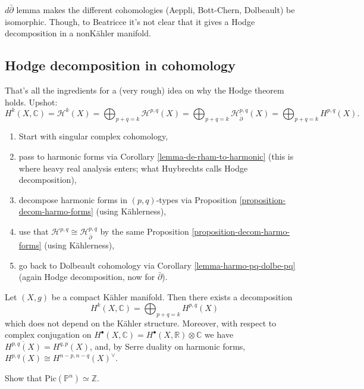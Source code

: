 \begin{remark}
\label{remark-ddbar-importance}
$d\bar\partial$ lemma makes
the different cohomologies 
(Aeppli, Bott-Chern, Dolbeault)
be isomorphic. Though, to Beatricce it's
not clear that it gives a Hodge decomposition
in a nonKähler manifold.
\end{remark}

\subsection{Hodge decomposition in
cohomology}
\label{subsection-hodge-decomposition-cohomology}

\noindent
That's all the ingredients for a
(very rough) idea on why the Hodge theorem
holds.
Upshot:
$$
H^k(X,\mathbb{C})
= \mathcal{H}^k(X)
= \bigoplus_{p+q=k}\mathcal{H}^{p,q}(X)
=
\bigoplus_{p+q=k}\mathcal{H}^{p,q}
_{\bar\partial}(X)
=\bigoplus_{p+q=k}H^{p,q}(X).
$$
\begin{enumerate}
\item Start with singular complex cohomology,
\item pass to harmonic forms
via Corollary \ref{lemma-de-rham-to-harmonic}
(this is where heavy real analysis enters;
what Huybrechts calls Hodge decomposition),
\item decompose harmonic forms in
$(p,q)$-types
via Proposition
\ref{proposition-decom-harmo-forms}
(using Kählerness),
\item use that $\mathcal{H}^{p,q}\cong
\mathcal{H}^{p,q}_{\bar\partial}$
by the same Proposition
\ref{proposition-decom-harmo-forms}
(using Kählerness),
\item go back to Dolbeault cohomology
via Corollary \ref{lemma-harmo-pq-dolbe-pq}
(again Hodge decomposition, now for
$\bar\partial$).
\end{enumerate}

\begin{theorem}[Hodge]
\label{theorem-hodge-theorem}
Let $(X,g)$ be a compact Kähler manifold.
Then there exists a decomposition
$$
H^k(X,\mathbb{C})
= \bigoplus_{p+q=k}H^{p,q}(X)
$$
which does not depend on the Kähler
structure.
Moreover, with respect to complex conjugation
on
$H^\bullet(X,\mathbb{C})=H^\bullet(X,
\mathbb{R})\otimes\mathbb{C}$
we have
$\overline{H^{p,q}(X)}=H^{q,p}(X)$,
and, by Serre duality on harmonic forms,
$H^{p,q}(X) \cong H^{n-p,n-q}(X)^\vee$.
\end{theorem}

\begin{exercise}
\label{exercise-pic-of-pn-is-z}
\begin{reference}
\cite[Exercise 3.2.11]{huc}
\end{reference}
Show that $\text{Pic}(\mathbb{P}^n) \simeq
\mathbb{Z}$.
\end{exercise}

